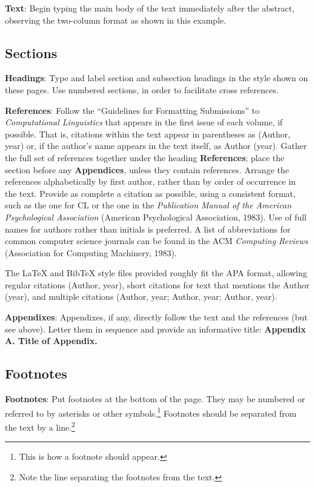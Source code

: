 \documentclass[11pt]{article}
\begin{document}
{\bf Text}: Begin typing the main body of the text immediately
after the abstract, observing the two-column format as shown in
this example.


\subsection{Sections}

{\bf Headings}: Type and label section and subsection headings in
the style shown on these pages.  Use numbered sections, in order
to facilitate cross references.

{\bf References}: Follow the ``Guidelines for Formatting
Submissions'' to {\em Computational Linguistics} that appears in
the first issue of each volume, if possible.  That is, citations
within the text appear in parentheses as (Author, year) or, if the
author's name appears in the text itself, as Author (year). Gather
the full set of references together under the heading {\bf
References}; place the section before any {\bf Appendices}, unless
they contain references. Arrange the references alphabetically by
first author, rather than by order of occurrence in the text.
Provide as complete a citation as possible, using a consistent
format, such as the one for CL or the one in the {\em
Publication Manual of the American Psychological Association}
(American Psychological Association, 1983).  Use of full names for
authors rather than initials is preferred.  A list of
abbreviations for common computer science journals can be found in
the ACM {\em Computing Reviews} (Association for Computing
Machinery, 1983).

The LaTeX and BibTeX style files provided roughly fit the APA format,
allowing regular citations (Author, year), short citations for text
that mentions the Author (year), and multiple citations (Author, year;
Author, year; Author, year).

{\bf Appendixes}: Appendixes, if any, directly follow the text and the
references (but see above).  Letter them in sequence and provide an
informative title: {\bf Appendix A. Title of Appendix.}


\subsection{Footnotes}

{\bf Footnotes}: Put footnotes at the bottom of the page. They may
be numbered or referred to by asterisks or other
symbols.\footnote{This is how a footnote should appear.} Footnotes
should be separated from the text by a line.\footnote{Note the
line separating the footnotes from the text.}
\end{document}

